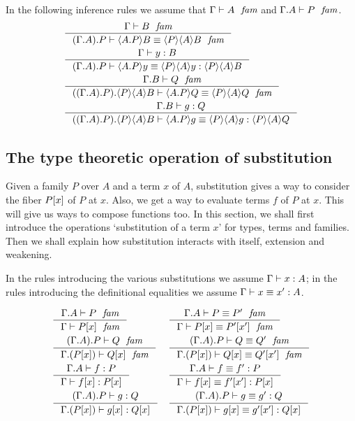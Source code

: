 In the following inference rules we assume that
$\jfam{\Gamma}{A}$ and $\jfam{\ctxext{\Gamma}{A}}{P}$. 
\begin{align}
& \inference{\jfam{\Gamma}{B}}
    {\jfameq{\ctxext{{\Gamma}{A}}{P}}{\ctxwk{\ctxext{A}{P}}{B}}{\ctxwk{P}{{A}{B}}}}\\
& \inference{\jterm{\Gamma}{B}{y}}
    {\jtermeq{\ctxext{{\Gamma}{A}}{P}}{\ctxwk{P}{{A}{B}}}{\ctxwk{\ctxext{A}{P}}{y}}{\ctxwk{P}{{A}{y}}}}\\
& \inference{\jfam{\ctxext{\Gamma}{B}}{Q}}
    {\jfameq{\ctxext{{{\Gamma}{A}}{P}}{\ctxwk{P}{{A}{B}}}}{\ctxwk{\ctxext{A}{P}}{Q}}{\ctxwk{P}{{A}{Q}}}}\\
& \inference{\jterm{\ctxext{\Gamma}{B}}{Q}{g}}
    {\jtermeq{\ctxext{{{\Gamma}{A}}{P}}{\ctxwk{P}{{A}{B}}}}{\ctxwk{P}{{A}{Q}}}{\ctxwk{\ctxext{A}{P}}{g}}{\ctxwk{P}{{A}{g}}}}
\end{align}

\subsection{The type theoretic operation of substitution}
Given a family $P$ over $A$ and a term $x$ of $A$, substitution gives a way to
consider the fiber $\subst{x}{P}$ of $P$ at $x$. Also, we get a way to evaluate
terms $f$ of $P$ at $x$. This will give us ways to compose functions too. In
this section, we shall first introduce the operations `substitution of a term $x$'
for types, terms and families. Then we shall explain how substitution interacts
with itself, extension and weakening.

In the rules introducing the various substitutions we assume $\jterm{\Gamma}{A}{x}$;
in the rules introducing the definitional equalities we assume $\jtermeq{\Gamma}{A}{x}{x'}$.

\begin{align}
& \inference{\jfam{\ctxext{\Gamma}{A}}{P}}{\jfam{\Gamma}{\subst{x}{P}}}
& & \inference{\jfameq{\ctxext{\Gamma}{A}}{P}{P'}}{\jfameq{\Gamma}{\subst{x}{P}}{\subst{x'}{P'}}}\\
& \inference{\jfam{\ctxext{{\Gamma}{A}}{P}}{Q}}{\jfam{\ctxext{\Gamma}{\subst{x}{P}}}{\subst{x}{Q}}}
& & \inference{\jfameq{\ctxext{{\Gamma}{A}}{P}}{Q}{Q'}}{\jfameq{\ctxext{\Gamma}{\subst{x}{P}}}{\subst{x}{Q}}{\subst{x'}{Q'}}}\\
& \inference{\jterm{\ctxext{\Gamma}{A}}{P}{f}}{\jterm{\Gamma}{\subst{x}{P}}{\subst{x}{f}}}
& & \inference{\jtermeq{\ctxext{\Gamma}{A}}{P}{f}{f'}}{\jtermeq{\Gamma}{\subst{x}{P}}{\subst{x}{f}}{\subst{x'}{f'}}}\\
& \inference{\jterm{\ctxext{{\Gamma}{A}}{P}}{Q}{g}}{\jterm{\ctxext{\Gamma}{\subst{x}{P}}}{\subst{x}{Q}}{\subst{x}{g}}}
& &\inference{\jtermeq{\ctxext{{\Gamma}{A}}{P}}{Q}{g}{g'}}{\jtermeq{\ctxext{\Gamma}{\subst{x}{P}}}{\subst{x}{Q}}{\subst{x}{g}}{\subst{x'}{g'}}}
\end{align}

